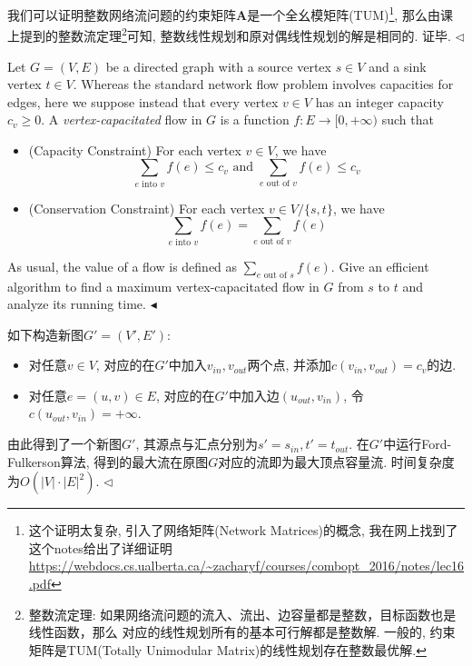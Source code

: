 \documentclass[11pt]{article}
\newenvironment{problem}[2][Problem]{\begin{trivlist}
    \item[\hskip \labelsep{\bfseries#1}\hskip\labelsep{\bfseries#2.}]\mbox{}\newline}{\hfill$\blacktriangleleft$\end{trivlist}}
\newenvironment{answer}[1][Answer]{\begin{trivlist}
\item[\hskip \labelsep{\bfseries\itshape#1.}\hskip \labelsep]}{\hfill$\lhd$\end{trivlist}}
\begin{document}
\begin{answer}
    我们可以证明整数网络流问题的约束矩阵$\bm{A}$是一个全幺模矩阵(TUM)\footnote{这个证明太复杂, 引入了网络矩阵(Network Matrices)的概念, 我在网上找到了这个notes给出了详细证明 \url{https://webdocs.cs.ualberta.ca/~zacharyf/courses/combopt_2016/notes/lec16.pdf}}, 那么由课上提到的整数流定理\footnote{整数流定理: 如果网络流问题的流入、流出、边容量都是整数，目标函数也是线性函数，那么 对应的线性规划所有的基本可行解都是整数解. 一般的, 约束矩阵是TUM(Totally Unimodular Matrix)的线性规划存在整数最优解.}可知, 整数线性规划和原对偶线性规划的解是相同的. 证毕.
\end{answer}

\begin{problem}{2. (Network Flow with Vertex Capacities)}
    Let $G=(V,E)$ be a directed graph with a source vertex $s\in V$ and a sink vertex $t \in V$. Whereas the standard network flow problem involves capacities for edges, here we suppose instead that every vertex $v\in V$ has an integer capacity $c_v \geqslant 0$. A \textit{vertex-capacitated} flow in $G$ is a function $f: E \rightarrow [0,+\infty)$ such that
    \begin{itemize}
        \item (Capacity Constraint) For each vertex $v\in V$, we have
        $$
        \sum_{e\text{ into }v} f(e) \leqslant c_v \text{ and } \sum_{e\text{ out of }v} f(e) \leqslant c_v
        $$
        
        \item (Conservation Constraint) For each vertex $v\in V/\{s,t\}$, we have
        $$
        \sum_{e\text{ into }v} f(e) = \sum_{e\text{ out of }v} f(e)
        $$
    \end{itemize}
    As usual, the value of a flow is defined as $\sum_{e\text{ out of }s}f(e)$. Give an efficient algorithm to find a maximum vertex-capacitated flow in $G$ from $s$ to $t$ and analyze its running time.    
\end{problem}
\begin{answer}
如下构造新图$G' = (V',E')$: 
\begin{itemize}
    \item 对任意$v \in V$, 对应的在$G'$中加入$v_{in}, v_{out}$两个点, 并添加$c(v_{in}, v_{out}) = c_v$的边.
    \item 对任意$e = (u,v) \in E$, 对应的在$G'$中加入边$(u_{out}, v_{in})$, 令$c(u_{out}, v_{in}) = +\infty$.
\end{itemize}
由此得到了一个新图$G'$, 其源点与汇点分别为$s' = s_{in}, t' = t_{out}$. 在$G'$中运行Ford-Fulkerson算法, 得到的最大流在原图$G$对应的流即为最大顶点容量流. 时间复杂度为$O(|V|\cdot |E|^2)$.
\end{answer}
\end{document}
